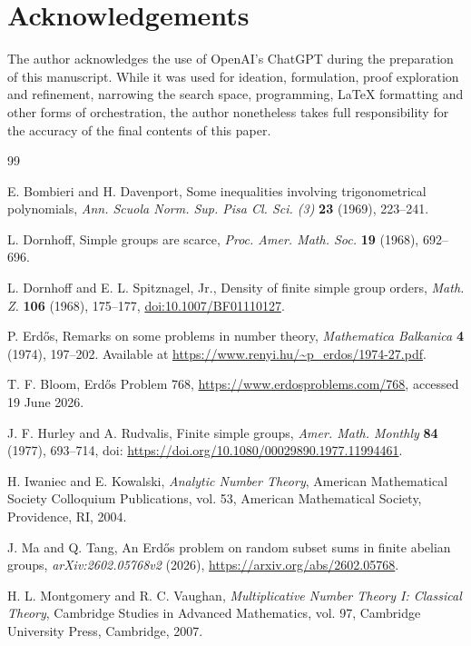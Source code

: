 \documentclass[11pt]{amsart}
\theoremstyle{definition}
\theoremstyle{remark}
\numberwithin{equation}{section}
\begin{document}
\section*{Acknowledgements}
The author acknowledges the use of OpenAI's ChatGPT during the preparation of this manuscript. While it was used for ideation, formulation, proof exploration and refinement, narrowing the search space, programming, LaTeX formatting and other forms of orchestration, the author nonetheless takes full responsibility for the accuracy of the final contents of this paper.

\begin{thebibliography}{99}

E. Bombieri and H. Davenport,
Some inequalities involving trigonometrical polynomials,
\emph{Ann. Scuola Norm. Sup. Pisa Cl. Sci. (3)} \textbf{23} (1969), 223--241.

L. Dornhoff,
Simple groups are scarce,
\emph{Proc. Amer. Math. Soc.} \textbf{19} (1968), 692--696.

L. Dornhoff and E. L. Spitznagel, Jr.,
Density of finite simple group orders,
\emph{Math. Z.} \textbf{106} (1968), 175--177,
\href{https://doi.org/10.1007/BF01110127}{doi:10.1007/BF01110127}.

P. Erd\H{o}s,
Remarks on some problems in number theory,
\emph{Mathematica Balkanica} \textbf{4} (1974), 197--202.
Available at \url{https://www.renyi.hu/~p_erdos/1974-27.pdf}.

T. F. Bloom,
Erd\H{o}s Problem 768,
\url{https://www.erdosproblems.com/768}, accessed 19 June 2026.

J. F. Hurley and A. Rudvalis,
Finite simple groups,
\emph{Amer. Math. Monthly} \textbf{84} (1977), 693--714,
doi: \url{https://doi.org/10.1080/00029890.1977.11994461}.

H. Iwaniec and E. Kowalski,
\emph{Analytic Number Theory},
American Mathematical Society Colloquium Publications, vol. 53,
American Mathematical Society, Providence, RI, 2004.

J. Ma and Q. Tang,
An Erd\H{o}s problem on random subset sums in finite abelian groups,
\emph{arXiv:2602.05768v2} (2026),
\url{https://arxiv.org/abs/2602.05768}.

H. L. Montgomery and R. C. Vaughan,
\emph{Multiplicative Number Theory I: Classical Theory},
Cambridge Studies in Advanced Mathematics, vol. 97,
Cambridge University Press, Cambridge, 2007.


\end{thebibliography}
\end{document}
